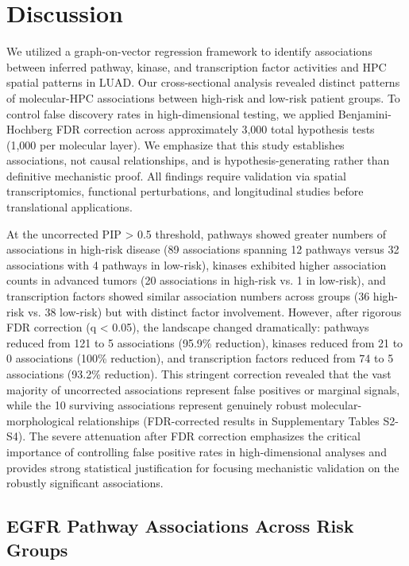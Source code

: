\documentclass[pdflatex,article,12pt]{article}
\begin{document}

\section{Discussion}

We utilized a graph-on-vector regression framework to identify associations between inferred pathway, kinase, and transcription factor activities and HPC spatial patterns in LUAD. Our cross-sectional analysis revealed distinct patterns of molecular-HPC associations between high-risk and low-risk patient groups. To control false discovery rates in high-dimensional testing, we applied Benjamini-Hochberg FDR correction across approximately 3,000 total hypothesis tests (1,000 per molecular layer). We emphasize that this study establishes associations, not causal relationships, and is hypothesis-generating rather than definitive mechanistic proof. All findings require validation via spatial transcriptomics, functional perturbations, and longitudinal studies before translational applications.

At the uncorrected PIP > 0.5 threshold, pathways showed greater numbers of associations in high-risk disease (89 associations spanning 12 pathways versus 32 associations with 4 pathways in low-risk), kinases exhibited higher association counts in advanced tumors (20 associations in high-risk vs. 1 in low-risk), and transcription factors showed similar association numbers across groups (36 high-risk vs. 38 low-risk) but with distinct factor involvement. However, after rigorous FDR correction (q < 0.05), the landscape changed dramatically: pathways reduced from 121 to 5 associations (95.9\% reduction), kinases reduced from 21 to 0 associations (100\% reduction), and transcription factors reduced from 74 to 5 associations (93.2\% reduction). This stringent correction revealed that the vast majority of uncorrected associations represent false positives or marginal signals, while the 10 surviving associations represent genuinely robust molecular-morphological relationships (FDR-corrected results in Supplementary Tables S2-S4). The severe attenuation after FDR correction emphasizes the critical importance of controlling false positive rates in high-dimensional analyses and provides strong statistical justification for focusing mechanistic validation on the robustly significant associations.

\subsection{EGFR Pathway Associations Across Risk Groups}
\end{document}
